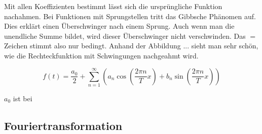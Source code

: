 Mit allen Koeffizienten bestimmt lässt sich die ursprüngliche Funktion nachahmen.
Bei Funktionen mit Sprungstellen tritt das Gibbsche Phänomen auf.
Dies erklärt einen Überschwinger nach einem Sprung. Auch wenn man die unendliche Summe bildet, wird dieser Überschwinger nicht verschwinden.
Das $=$ Zeichen stimmt also nur bedingt.
Anhand der Abbildung ... sieht man sehr schön, wie die Rechteckfunktion mit Schwingungen nachgeahmt wird.

\[
f(t) = \frac{a_0}{2} + \sum_{n=1}^{\infty} \left( a_n \cos\left( \frac{2\pi n}{T} x \right) + b_n \sin\left( \frac{2\pi n}{T} x \right) \right)
\]


$a_0$ ist bei 


\subsection{Fouriertransformation\label{fourier:subsection:fouriertransformation}}

